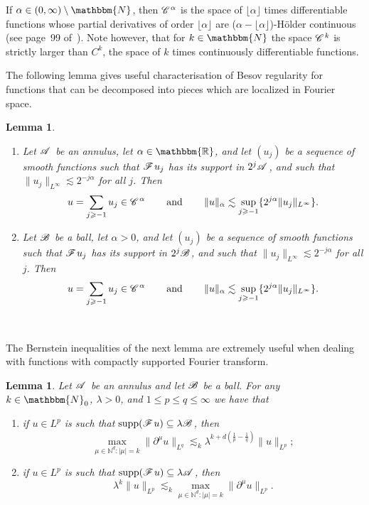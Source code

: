 \documentclass{amsart}
\newcommand{\tmdummy}{$\mbox{}$}
\newcommand{\tmop}[1]{\ensuremath{\operatorname{#1}}}
\newenvironment{enumeratenumeric}{\begin{enumerate}[1.] }{\end{enumerate}}
\newtheorem{lemma}[theorem]{Lemma}
\theoremstyle{remark}
\theoremstyle{definition}
\newcommand{\CC}{\mathscr{C} \hspace{.1em}}
\newcommand{\CF}{\mathscr{F} \hspace{.1em}}
\newcommand{\CB}{\mathscr{B} \hspace{.1em}}
\newcommand{\CA}{\mathscr{A} \hspace{.1em}}
\begin{document}
If $\alpha \in (0, \infty) \setminus \mathbbm{N}$, then $\CC^{\alpha}$ is the
space of $\lfloor \alpha \rfloor$ times differentiable functions whose partial
derivatives of order $\lfloor \alpha \rfloor$ are ($\alpha - \lfloor \alpha
\rfloor$)-H{\"o}lder continuous (see page~99
of~{\cite{bahouri_fourier_2011}}). Note however, that for $k \in \mathbbm{N}$
the space $\CC^k$ is strictly larger than $C^k$, the space of $k$ times
continuously differentiable functions.

The following lemma gives useful characterisation of Besov regularity for
functions that can be decomposed into pieces which are localized in Fourier
space.

\begin{lemma}
  \label{lem: Besov regularity of series}{\tmdummy}
  
  \begin{enumeratenumeric}
    \item Let $\CA$ be an annulus, let $\alpha \in \mathbb{\mathbbm{R}}$, and
    let $(u_j)$ be a sequence of smooth functions such that $\CF u_j$ has its
    support in $2^j \CA$, and such that $\|u_j \|_{L^{\infty}} \lesssim 2^{- j
    \alpha}$ for all $j$. Then
    \[ u = \sum_{j \geqslant - 1} u_j \in \CC^{\alpha} \qquad \tmop{and}
       \qquad \|u\|_{\alpha} \lesssim \sup_{j \geqslant - 1} \{2^{j \alpha}
       \|u_j \|_{L^{\infty}} \} . \]
    \item Let $\CB$ be a ball, let $\alpha > 0$, and let $(u_j)$ be a sequence
    of smooth functions such that $\CF u_j$ has its support in $2^j \CB$, and
    such that $\|u_j \|_{L^{\infty}} \lesssim 2^{- j \alpha}$ for all $j$.
    Then
    \[ u = \sum_{j \geqslant - 1} u_j \in \CC^{\alpha} \qquad \tmop{and}
       \qquad \|u\|_{\alpha} \lesssim \sup_{j \geqslant - 1} \{2^{j \alpha}
       \|u_j \|_{L^{\infty}} \} . \]
  \end{enumeratenumeric}
\end{lemma}

\

The Bernstein inequalities of the next lemma are extremely useful when
dealing with functions with compactly supported Fourier transform.

\begin{lemma}
  \label{lemma:Bernstein}Let $\CA$ be an annulus and let $\CB$ be a ball. For
  any $k \in \mathbbm{N}_0$, $\lambda > 0$, and $1 \leqslant p \leqslant q
  \leqslant \infty$ we have that
  \begin{enumeratenumeric}
    \item if $u \in L^p$ is such that $\tmop{supp} (\CF u) \subseteq \lambda
    \CB$, then
    \[ \max_{\mu \in \mathbb{N}^d : | \mu | = k} \| \partial^{\mu} u\|_{L^q}
       \lesssim_k \lambda^{k + d \left( \frac{1}{p} - \frac{1}{q} \right)}
       \|u\|_{L^p} ; \]
    \item if $u \in L^p$ is such that $\tmop{supp} (\CF u) \subseteq \lambda
    \CA$, then
    \[ \lambda^k \|u\|_{L^p} \lesssim_k \max_{\mu \in \mathbb{N}^d : | \mu | =
       k} \| \partial^{\mu} u\|_{L^p} . \]
  \end{enumeratenumeric}
\end{lemma}
\end{document}
